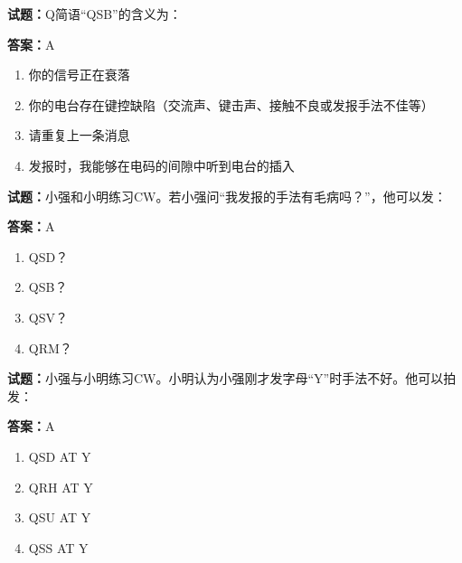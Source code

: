 \documentclass{ctexbook}
\begin{document}




\vspace{1em}

\textbf{试题：}Q简语“QSB”的含义为： 

\textbf{答案：}A 

\begin{enumerate}[leftmargin=3em]
  \item 你的信号正在衰落 

  \item 你的电台存在键控缺陷（交流声、键击声、接触不良或发报手法不佳等） 

  \item 请重复上一条消息 

  \item 发报时，我能够在电码的间隙中听到电台的插入 

\end{enumerate}





\vspace{1em}

\textbf{试题：}小强和小明练习CW。若小强问“我发报的手法有毛病吗？”，他可以发： 

\textbf{答案：}A 

\begin{enumerate}[leftmargin=3em]
  \item QSD？ 

  \item QSB？ 

  \item QSV？ 

  \item QRM？ 

\end{enumerate}





\vspace{1em}

\textbf{试题：}小强与小明练习CW。小明认为小强刚才发字母“Y”时手法不好。他可以拍发： 

\textbf{答案：}A 

\begin{enumerate}[leftmargin=3em]
  \item QSD AT Y 

  \item QRH AT Y 

  \item QSU AT Y 

  \item QSS AT Y 

\end{enumerate}
\end{document}
